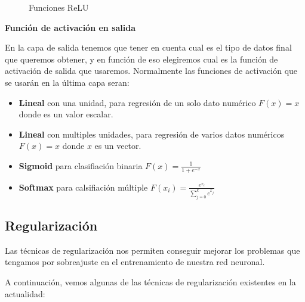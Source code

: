 \documentclass[
  a4paper,
  DIV=11,
  numbers=noendperiod]{scrreprt}
\begin{document}
\begin{figure}


\caption{\label{fig-funciones_activacion}Funciones ReLU}

\end{figure}%

\textbf{Función de activación en salida}

En la capa de salida tenemos que tener en cuenta cual es el tipo de
datos final que queremos obtener, y en función de eso elegiremos cual es
la función de activación de salida que usaremos. Normalmente las
funciones de activación que se usarán en la última capa seran:

\begin{itemize}
\item
  \textbf{Lineal} con una unidad, para regresión de un solo dato
  numérico \(F(x)=x\) donde es un valor escalar.
\item
  \textbf{Lineal} con multiples unidades, para regresión de varios datos
  numéricos \(F(x)=x\) donde \(x\) es un vector.
\item
  \textbf{Sigmoid} para clasifiación binaria \(F(x)=\frac{1}{1+e^{-x}}\)
\item
  \textbf{Softmax} para calsifiación múltiple
  \(F\left(x_i\right)=\frac{e^{x_i}}{\sum_{j=0}^k e^{x_j}}\)
\end{itemize}

\subsection{Regularización}\label{regularizaciuxf3n}

Las técnicas de regularización nos permiten conseguir mejorar los
problemas que tengamos por sobreajuste en el entrenamiento de nuestra
red neuronal.

A continuación, vemos algunas de las técnicas de regularización
existentes en la actualidad:
\end{document}
